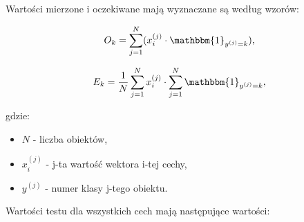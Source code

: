     Wartości mierzone i oczekiwane mają wyznaczane są według wzorów:

    \begin{equation}
        O_k = \sum_{j=1}^{N} (x_i^{(j)} \cdot \mathbbm{1}_{y^{(j)}=k}),
    \end{equation}


    \begin{equation}
        E_k = \frac{1}{N} \sum_{j=1}^{N} {x_i^{(j)}} \cdot \sum_{j=1}^{N} {\mathbbm{1}_{y^{(j)}=k}},
    \end{equation}

    gdzie:
    \begin{itemize}
        \item $N$ - liczba obiektów,
        \item $x_i^{(j)}$ - j-ta wartość wektora i-tej cechy,
        \item $y^{(j)}$ - numer klasy j-tego obiektu.
    \end{itemize}

    Wartości testu dla wszystkich cech mają następujące wartości:

    \vspace{1em}

